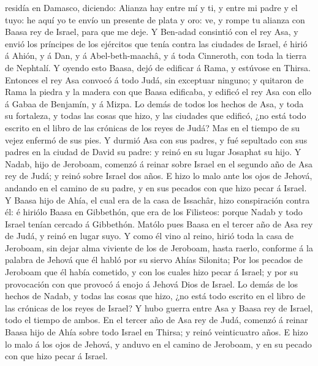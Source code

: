 residía en Damasco, diciendo:  Alianza hay entre mí y ti, y
entre mi padre y el tuyo: he aquí yo te envío un presente de plata y
oro: ve, y rompe tu alianza con Baasa rey de Israel, para que me deje.
 Y Ben-adad consintió con el rey Asa, y envió los príncipes
de los ejércitos que tenía contra las ciudades de Israel, é hirió á
Ahión, y á Dan, y á Abel-beth-maachâ, y á toda Cinneroth, con toda la
tierra de Nephtalí.  Y oyendo esto Baasa, dejó de edificar
á Rama, y estúvose en Thirsa.  Entonces el rey Asa convocó
á todo Judá, sin exceptuar ninguno; y quitaron de Rama la piedra y la
madera con que Baasa edificaba, y edificó el rey Asa con ello á Gabaa de
Benjamín, y á Mizpa.  Lo demás de todos los hechos de Asa,
y toda su fortaleza, y todas las cosas que hizo, y las ciudades que
edificó, ¿no está todo escrito en el libro de las crónicas de los reyes
de Judá? Mas en el tiempo de su vejez enfermó de sus pies. 
Y durmió Asa con sus padres, y fué sepultado con sus padres en la ciudad
de David su padre: y reinó en su lugar Josaphat su hijo.  Y
Nadab, hijo de Jeroboam, comenzó á reinar sobre Israel en el segundo año
de Asa rey de Judá; y reinó sobre Israel dos años.  E hizo
lo malo ante los ojos de Jehová, andando en el camino de su padre, y en
sus pecados con que hizo pecar á Israel.  Y Baasa hijo de
Ahía, el cual era de la casa de Issachâr, hizo conspiración contra él: é
hiriólo Baasa en Gibbethón, que era de los Filisteos: porque Nadab y
todo Israel tenían cercado á Gibbethón.  Matólo pues Baasa
en el tercer año de Asa rey de Judá, y reinó en lugar suyo.
 Y como él vino al reino, hirió toda la casa de Jeroboam,
sin dejar alma viviente de los de Jeroboam, hasta raerlo, conforme á la
palabra de Jehová que él habló por su siervo Ahías Silonita;
 Por los pecados de Jeroboam que él había cometido, y con
los cuales hizo pecar á Israel; y por su provocación con que provocó á
enojo á Jehová Dios de Israel.  Lo demás de los hechos de
Nadab, y todas las cosas que hizo, ¿no está todo escrito en el libro de
las crónicas de los reyes de Israel?  Y hubo guerra entre
Asa y Baasa rey de Israel, todo el tiempo de ambos.  En el
tercer año de Asa rey de Judá, comenzó á reinar Baasa hijo de Ahía sobre
todo Israel en Thirsa; y reinó veinticuatro años.  E hizo
lo malo á los ojos de Jehová, y anduvo en el camino de Jeroboam, y en su
pecado con que hizo pecar á Israel.

